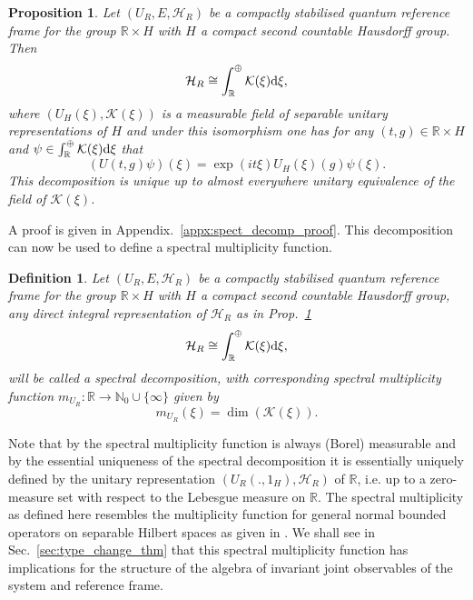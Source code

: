 \documentclass[sn-mathphys-num]{sn-jnl}%
\newcommand{\RR}{\mathbb{R}}
\newcommand{\HH}{\mathcal{H}}
\newcommand{\KK}{\mathcal{K}}
\newcommand{\diff}{\textup{d}}
\numberwithin{equation}{section}
\theoremstyle{thmstyleone}%
\newtheorem{proposition}[theorem]{Proposition}%
\theoremstyle{thmstyletwo}%
\theoremstyle{thmstylethree}%
\newtheorem{definition}[theorem]{Definition}%
\begin{document}
\begin{proposition}
\label{prop:spect_decomp}
    Let $(U_R,E,\HH_R)$ be a compactly stabilised quantum reference frame for the group $\RR\times H$ with $H$ a compact second countable Hausdorff group. Then 
    \begin{equation}
        \HH_R\cong\int_\RR^\oplus \KK(\xi)\diff\xi,
    \end{equation}
    where $(U_{H}(\xi),\KK(\xi))$ is a measurable field of separable unitary representations of $H$ and under this isomorphism one has for any $(t,g)\in \RR\times H$ and $\psi\in \int_\RR^\oplus \KK(\xi)\diff\xi$ that
    \begin{equation}
        (U(t,g)\psi)(\xi)=\exp(it\xi)U_{H}(\xi)(g)\psi(\xi).
    \end{equation}
    This decomposition is unique up to almost everywhere unitary equivalence of the field of $\KK(\xi)$.  
\end{proposition}
A proof is given in Appendix.\ \ref{appx:spect_decomp_proof}. This decomposition can now be used to define a spectral multiplicity function.
\begin{definition}
\label{def:spec_mult}
    Let $(U_R,E,\HH_R)$ be a compactly stabilised quantum reference frame for the group $\RR\times H$ with $H$ a compact second countable Hausdorff group, any direct integral representation of $\HH_R$ as in Prop.\ \ref{prop:spect_decomp} 
    \begin{equation}
        \HH_R\cong \int_\RR^\oplus \KK(\xi)\diff \xi,
    \end{equation}
    will be called a \textup{spectral decomposition}, with corresponding \textup{spectral multiplicity function} $m_{U_R}:\RR\to \mathbb{N}_0\cup\{\infty\}$ given by
    \begin{equation}
        m_{U_R}(\xi)=\dim(\KK(\xi)).
    \end{equation}
\end{definition}
Note that by \cite[Lem.\ IV.8.12]{Takesaki2001} the spectral multiplicity function is always (Borel) measurable and by the essential uniqueness of the spectral decomposition it is essentially uniquely defined by the unitary representation $(U_R(.,1_H),\HH_R)$ of $\RR$, i.e. up to a zero-measure set with respect to the Lebesgue measure on $\RR$. The spectral multiplicity as defined here resembles the multiplicity function for general normal bounded operators on separable Hilbert spaces as given in \cite[Ch.\ IX \S 10]{Conway}. We shall see in Sec.\ \ref{sec:type_change_thm} that this spectral multiplicity function has implications for the structure of the algebra of
invariant joint observables of the system and reference frame.
\end{document}
